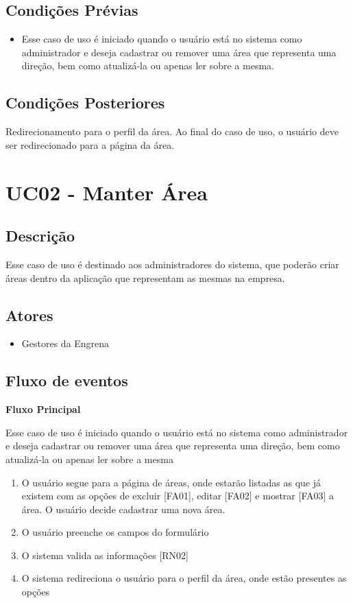 \begin{apendicesenv}
\subsection{Condições Prévias}
\begin{itemize}
\item{Esse caso de uso é iniciado quando o usuário está no sistema como administrador e deseja cadastrar ou remover uma área que representa uma direção, bem como atualizá-la ou apenas ler sobre a mesma.}
\end{itemize}

\subsection{Condições Posteriores}

Redirecionamento para o perfil da área. Ao final do caso de uso, o usuário deve ser redirecionado para a página da área.


\section{UC02 - Manter Área}

\subsection{Descrição}

Esse caso de uso é destinado aos administradores do sistema, que poderão criar áreas dentro da aplicação que representam as mesmas na empresa.

\subsection{Atores}

\begin{itemize}
  \item{Gestores da Engrena}
\end{itemize}

\subsection{Fluxo de eventos}

\textbf{Fluxo Principal}

Esse caso de uso é iniciado quando o usuário está no sistema como administrador e deseja cadastrar ou remover uma área que representa uma direção, bem como atualizá-la ou apenas ler sobre a mesma

\begin{enumerate}
  \item{O usuário segue para a página de áreas, onde estarão listadas as que já existem com as opções de excluir [FA01], editar [FA02] e mostrar [FA03] a área. O usuário decide cadastrar uma nova área.}
  \item{O usuário preenche os campos do formulário}
  \item{O sistema valida as informações [RN02]}
  \item{O sistema redireciona o usuário para o perfil da área, onde estão presentes as opções}
\end{enumerate}



\end{apendicesenv}
